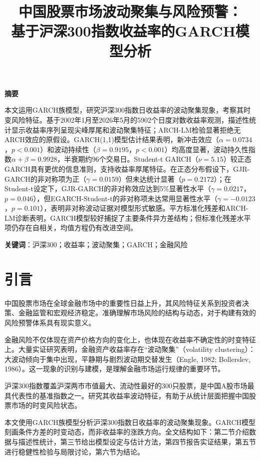 \documentclass[11pt,a4paper]{article}
\title{\textbf{中国股票市场波动聚集与风险预警：\\基于沪深300指数收益率的GARCH模型分析}}
\author{}
\date{}
\begin{document}
\maketitle

\begin{center}
\large\textbf{摘\quad 要}
\end{center}

本文运用GARCH族模型，研究沪深300指数日收益率的波动聚集现象，考察其时变风险特征。基于2002年1月至2026年5月的5902个日度对数收益率观测，描述性统计显示收益率序列呈现尖峰厚尾和波动聚集特征；ARCH-LM检验显著拒绝无ARCH效应的原假设。GARCH(1,1)模型估计结果表明，新冲击效应（\(\alpha=0.0734\)，\(p<0.001\)）和波动持续性（\(\beta=0.9195\)，\(p<0.001\)）均高度显著，波动持久性指数\(\alpha+\beta=0.9928\)，半衰期约96个交易日。Student-t GARCH（\(\nu=5.15\)）较正态GARCH具有更优的信息准则，支持收益率厚尾特征。在正态分布假设下，GJR-GARCH的非对称项为正（\(\gamma=0.0159\)）但未达统计显著（\(p=0.2172\)）；在Student-t设定下，GJR-GARCH的非对称效应达到5\%显著性水平（\(\gamma=0.0217\)，\(p=0.046\)），但EGARCH-Student-t的非对称项未达常用显著性水平（\(\gamma=-0.0123\)，\(p=0.101\)），表明非对称波动证据对模型形式敏感。平方标准化残差和ARCH-LM诊断表明，GARCH模型较好捕捉了主要条件异方差结构；但标准化残差水平项仍存在自相关，均值方程仍有改进空间。

\vspace{1em}
\textbf{关键词}：沪深300；收益率；波动聚集；GARCH；金融风险

\newpage

\section{引言}

中国股票市场在全球金融市场中的重要性日益上升，其风险特征关系到投资者决策、金融监管和宏观经济稳定。准确理解市场风险的结构与动态，对于构建有效的风险预警体系具有现实意义。

金融风险不仅体现在资产价格方向的变化上，也体现在收益率不确定性的时变特征上。大量实证研究表明，金融资产收益率存在“波动聚集”（volatility clustering）：大波动倾向于集中出现，平静期与剧烈波动期交替发生（Engle, 1982; Bollerslev, 1986）。这一现象的识别与建模，是理解金融市场运行规律的重要环节。

沪深300指数覆盖沪深两市市值最大、流动性最好的300只股票，是中国A股市场最具代表性的基准指数之一。研究其收益率波动特征，有助于从统计层面把握中国股票市场的时变风险状态。

本文使用GARCH族模型分析沪深300指数日收益率的波动聚集现象。GARCH模型刻画条件方差的时变动态，而非收益率的涨跌方向。全文结构如下：第二节介绍数据与描述性统计，第三节给出模型设定与估计方法，第四节报告实证结果，第五节进行稳健性检验与局限讨论，第六节为结论。
\end{document}
